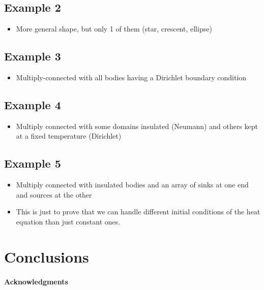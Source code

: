 \documentclass[preprint, 10pt]{elsarticle}
\begin{document}
\subsection{Example 2}
\begin{itemize}
  \item More general shape, but only 1 of them (star, crescent, ellipse)
\end{itemize}

\subsection{Example 3}
\begin{itemize}
  \item Multiply-connected with all bodies having a Dirichlet boundary
    condition
\end{itemize}

\subsection{Example 4}
\begin{itemize}
  \item Multiply connected with some domains insulated (Neumann) and
    others kept at a fixed temperature (Dirichlet)
\end{itemize}

\subsection{Example 5}
\begin{itemize}
  \item Multiply connected with insulated bodies and an array of sinks
    at one end and sources at the other
  \item This is just to prove that we can handle different initial
    conditions of the heat equation than just constant ones.
\end{itemize}

\section{Conclusions\label{s:conclusions}}

\paragraph{\bf Acknowledgments} 

 


\end{document}
